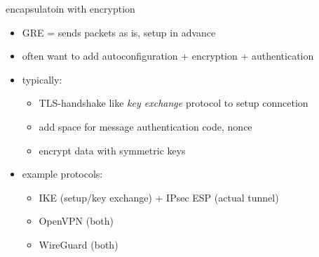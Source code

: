 \begin{frame}{encapsulatoin with encryption}
    \begin{itemize}
    \item GRE = sends packets as is, setup in advance
    \vspace{.5cm}
    \item often want to add autoconfiguration + encryption + authentication
    \item typically:
        \begin{itemize}
        \item TLS-handshake like \textit{key exchange} protocol to setup conncetion
        \item add space for message authentication code, nonce
        \item encrypt data with symmetric keys
        \end{itemize}
    \item example protocols:
        \begin{itemize}
        \item IKE (setup/key exchange) + IPsec ESP (actual tunnel)
        \item OpenVPN (both)
        \item WireGuard (both)
        \end{itemize}
    \end{itemize}
\end{frame}

